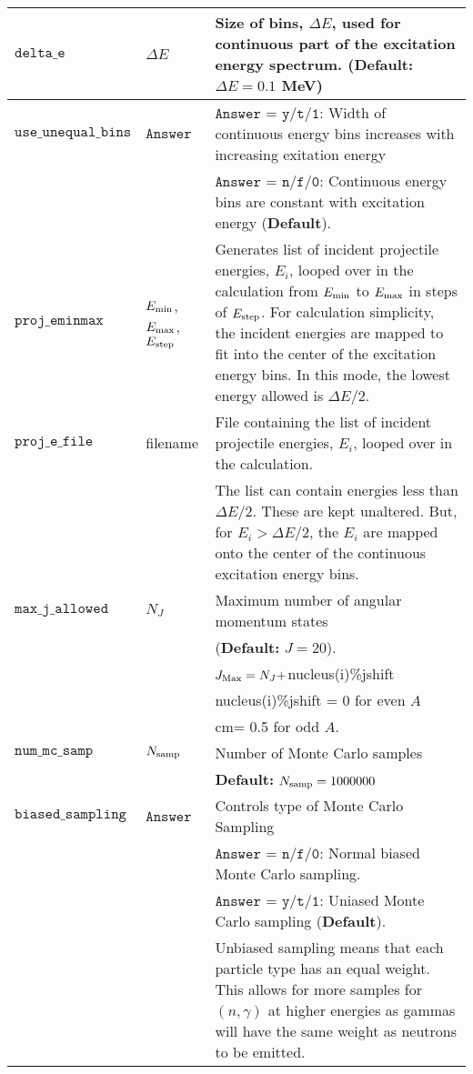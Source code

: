 \documentclass[
10pt,
showpacs,preprintnumbers,footinbib,
amsfonts,amsmath,amssymb,
aps,
prc,twocolumn,groupedaddress,superscriptaddress,
showkeys,
nofootinbib
]{revtex4-1}
\begin{document}
\begin{center}
\begin{tabular}{| p{4cm} | p{4 cm} | p{9 cm} |}
\hline
${\texttt{delta\_e}}$ &  $\Delta E$ &    Size of bins, $\Delta E$, used for continuous part of the excitation energy spectrum. ({\bf Default:} $\Delta E = 0.1$  MeV) \\
\hline
${\texttt{use\_unequal\_bins}}$ & ${\texttt{Answer}}$ & ${\texttt{Answer}}$ = ${\texttt{y/t/1}}$: Width of continuous energy bins increases with increasing exitation energy \\
         &           & ${\texttt{Answer}}$ = ${\texttt{n/f/0}}$: Continuous energy bins are constant with excitation energy ({\bf Default}).\\
\hline
${\texttt{proj\_eminmax}}$  & $E_{\rm min}$, $E_{\rm max}$, $E_{\rm step}$ &
    Generates list of incident projectile energies, $E_i$, looped over in the 
    calculation from $E_{\rm min}$ to $E_{\rm max}$ in steps of $E_{\rm step}$. For calculation 
    simplicity, the incident energies are mapped 
    to fit into the center of the excitation energy bins. In this mode, the 
    lowest energy allowed is $\Delta E/2$. \\
 \hline
${\texttt{proj\_e\_file}}$  & filename &
       File containing the list of incident projectile energies, $E_i$, looped over
       in the calculation. \\
& & The list can contain energies less than $\Delta E/2$.
      These are kept unaltered. But, for $E_i > \Delta E/2$, the $E_i$ are 
      mapped onto the center of the continuous excitation energy bins.\\
\hline
${\texttt{max\_j\_allowed}}$ & $N_J$ &  Maximum number of angular momentum states \\
 & & ({\bf Default:} $J=20$).\\
  &  &   $J_{\rm Max} = N_J + $nucleus(i)\%jshift  \\
  &  &  nucleus(i)\%jshift = 0 for even $A$ \\
  &  &  \hskip 2.7 cm= 0.5 for odd $A$. \\
\hline
${\texttt{num\_mc\_samp }}$ & $N_{\rm samp}$ &    Number of Monte Carlo samples \\
 &  &  {\bf Default:} $N_{\rm samp} = 1000000$\\
\hline
${\texttt{biased\_sampling}}$ & ${\texttt{Answer}}$  & Controls type of Monte Carlo Sampling \\
& & ${\texttt{Answer}}$ = ${\texttt{n/f/0}}$: Normal biased Monte Carlo sampling.\\  
& & ${\texttt{Answer}}$ = ${\texttt{y/t/1}}$: Uniased Monte Carlo sampling ({\bf Default}).\\
& & Unbiased sampling means that each particle type has an equal weight. This allows for more samples for $(n,\gamma)$ at higher energies as gammas will have the same weight as neutrons to be emitted.\\
\hline
\end{tabular}
\end{center}
\end{document}
